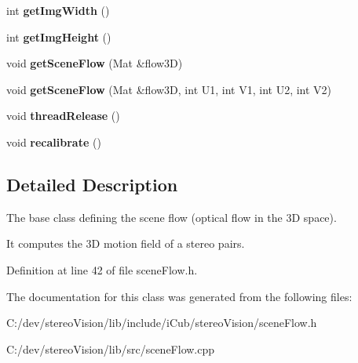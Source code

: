 \begin{DoxyCompactItemize}
\item 
int {\bfseries get\+Img\+Width} ()\label{classSceneFlow_a0844d30b0f1c10828f2144eb446e99fb}

\item 
int {\bfseries get\+Img\+Height} ()\label{classSceneFlow_a3c0fbe6df132fba94a0b24a8d1e90661}

\item 
void {\bfseries get\+Scene\+Flow} (Mat \&flow3\+D)\label{classSceneFlow_a8920f6b49c46d524fa543ac1e55c18e8}

\item 
void {\bfseries get\+Scene\+Flow} (Mat \&flow3\+D, int U1, int V1, int U2, int V2)\label{classSceneFlow_a82e1c079533882d4662fa29853d02f76}

\item 
void {\bfseries thread\+Release} ()\label{classSceneFlow_a999d87ea72266a0fc258b94a95fa48ec}

\item 
void {\bfseries recalibrate} ()\label{classSceneFlow_aecfc668fbb7d6800010abfe424a37aae}

\end{DoxyCompactItemize}


\subsection{Detailed Description}
The base class defining the scene flow (optical flow in the 3\+D space). 

It computes the 3\+D motion field of a stereo pairs. 

Definition at line 42 of file scene\+Flow.\+h.



The documentation for this class was generated from the following files\+:\begin{DoxyCompactItemize}
\item 
C\+:/dev/stereo\+Vision/lib/include/i\+Cub/stereo\+Vision/scene\+Flow.\+h\item 
C\+:/dev/stereo\+Vision/lib/src/scene\+Flow.\+cpp\end{DoxyCompactItemize}
